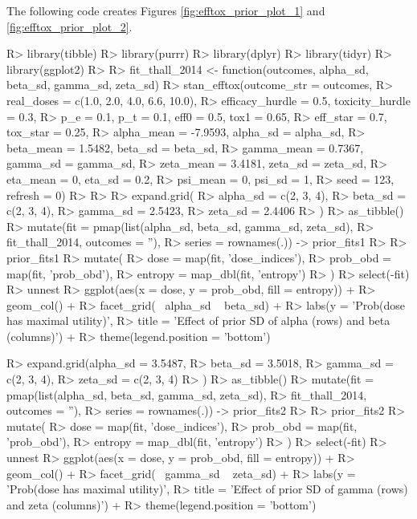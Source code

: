 \documentclass[article]{jss}
\begin{document}
The following code creates Figures \ref{fig:efftox_prior_plot_1} and
\ref{fig:efftox_prior_plot_2}.

\begin{CodeChunk}

\begin{CodeInput}
R> library(tibble)
R> library(purrr)
R> library(dplyr)
R> library(tidyr)
R> library(ggplot2)
R> 
R> fit_thall_2014 <- function(outcomes, alpha_sd, beta_sd, gamma_sd, zeta_sd) {
R>   stan_efftox(outcome_str = outcomes, 
R>               real_doses = c(1.0, 2.0, 4.0, 6.6, 10.0),
R>               efficacy_hurdle = 0.5, toxicity_hurdle = 0.3,
R>               p_e = 0.1, p_t = 0.1, eff0 = 0.5, tox1 = 0.65,
R>               eff_star = 0.7, tox_star = 0.25,
R>               alpha_mean = -7.9593, alpha_sd = alpha_sd,
R>               beta_mean = 1.5482, beta_sd = beta_sd,
R>               gamma_mean = 0.7367, gamma_sd = gamma_sd,
R>               zeta_mean = 3.4181, zeta_sd = zeta_sd,
R>               eta_mean = 0, eta_sd = 0.2,
R>               psi_mean = 0, psi_sd = 1, 
R>               seed = 123, refresh = 0)
R> }
R> 
R> expand.grid(
R>   alpha_sd = c(2, 3, 4), 
R>   beta_sd = c(2, 3, 4), 
R>   gamma_sd = 2.5423,
R>   zeta_sd = 2.4406
R> ) %
R>   as_tibble() %
R>   mutate(fit = pmap(list(alpha_sd, beta_sd, gamma_sd, zeta_sd), 
R>                     fit_thall_2014, outcomes = ''),
R>          series = rownames(.)) -> prior_fits1
R> 
R> prior_fits1 %
R>   mutate(
R>     dose = map(fit, 'dose_indices'),
R>     prob_obd = map(fit, 'prob_obd'),
R>     entropy = map_dbl(fit, 'entropy')
R>   ) %
R>   select(-fit) %
R>   unnest %
R>   ggplot(aes(x = dose, y = prob_obd, fill = entropy)) + 
R>   geom_col() + 
R>   facet_grid(~ alpha_sd ~ beta_sd) + 
R>   labs(y = 'Prob(dose has maximal utility)', 
R>        title = 'Effect of prior SD of alpha (rows) and beta (columns)') + 
R>   theme(legend.position = 'bottom')
\end{CodeInput}
\end{CodeChunk}

\begin{CodeChunk}

\begin{CodeInput}
R> expand.grid(alpha_sd = 3.5487, 
R>             beta_sd = 3.5018,
R>             gamma_sd = c(2, 3, 4),
R>             zeta_sd = c(2, 3, 4)
R> ) %
R>   as_tibble() %
R>   mutate(fit = pmap(list(alpha_sd, beta_sd, gamma_sd, zeta_sd), 
R>                     fit_thall_2014, outcomes = ''),
R>          series = rownames(.)) -> prior_fits2
R> 
R> prior_fits2 %
R>   mutate(
R>     dose = map(fit, 'dose_indices'),
R>     prob_obd = map(fit, 'prob_obd'),
R>     entropy = map_dbl(fit, 'entropy')
R>   ) %
R>   select(-fit) %
R>   unnest %
R>   ggplot(aes(x = dose, y = prob_obd, fill = entropy)) + 
R>   geom_col() + 
R>   facet_grid(~ gamma_sd ~ zeta_sd) + 
R>   labs(y = 'Prob(dose has maximal utility)', 
R>        title = 'Effect of prior SD of gamma (rows) and zeta (columns)') + 
R>   theme(legend.position = 'bottom')
\end{CodeInput}
\end{CodeChunk}
\end{document}
